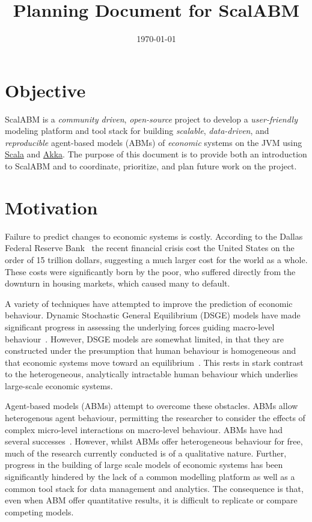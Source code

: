 \documentclass[a4paper]{article}
\title{Planning Document for ScalABM}
\date{\today}
\begin{document}
\maketitle

\section{Objective}

ScalABM is a \textit{community driven}, \textit{open-source} project to develop a \textit{user-friendly} modeling platform and tool stack for building \textit{scalable}, \textit{data-driven}, and \textit{reproducible} agent-based models (ABMs) of \textit{economic} systems on the JVM using \href{http://www.scala-lang.org/}{Scala} and \href{http://akka.io/}{Akka}. The purpose of this document is to provide both an introduction to ScalABM and to coordinate, prioritize, and plan future work on the project. 

\section{Motivation}

Failure to predict changes to economic systems is costly. According to the Dallas Federal Reserve Bank~\citep{Luttrell2013Costs} the recent financial crisis cost the United States on the order of 15 trillion dollars, suggesting a much larger cost for the world as a whole. These costs were significantly
born by the poor, who suffered directly from the downturn in housing markets, which caused many to default.

A variety of techniques have attempted to improve the prediction of economic behaviour. Dynamic Stochastic General Equilibrium (DSGE) models have made significant progress in assessing the underlying forces guiding macro-level behaviour~\citep{Smets2003,Sungbae2007BaysianDSGE}. However, DSGE models are somewhat limited, in that they are constructed under the presumption that human behaviour is homogeneous and that economic systems move toward an equilibrium~\citep{Farmer2009NeedABM}. This rests in stark contrast to the heterogeneous, analytically intractable human behaviour which underlies large-scale economic systems.

Agent-based models (ABMs) attempt to overcome these obstacles. ABMs allow heterogenous agent behaviour, permitting the researcher to consider the effects of complex micro-level interactions on macro-level behaviour. ABMs have had several successes~\citep{Klimek2015144,Poledna2014199,Deissenberg2008541,Schelling1971}. However, whilst ABMs offer heterogeneous behaviour for free, much of the research currently conducted is of a qualitative nature. Further, progress in the building of large scale models of economic systems has been significantly hindered by the lack of a common modelling platform as well as a common tool stack for data management and analytics. The consequence is that, even when ABM offer quantitative results, it is difficult to replicate or compare competing models.
\end{document}
